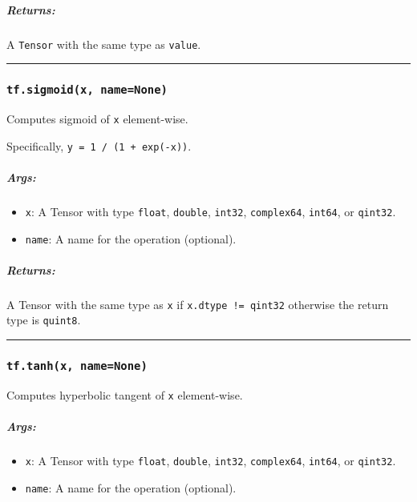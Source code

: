 \subparagraph{Returns: }\label{returns-4}

A \texttt{Tensor} with the same type as \texttt{value}.

\begin{center}\rule{0.5\linewidth}{\linethickness}\end{center}

\subsubsection{\texorpdfstring{\texttt{tf.sigmoid(x,\ name=None)}
}{tf.sigmoid(x, name=None) }}\label{tf.sigmoidx-namenone}

Computes sigmoid of \texttt{x} element-wise.

Specifically, \texttt{y\ =\ 1\ /\ (1\ +\ exp(-x))}.

\subparagraph{Args: }\label{args-5}

\begin{itemize}
\tightlist
\item
  \texttt{x}: A Tensor with type \texttt{float}, \texttt{double},
  \texttt{int32}, \texttt{complex64}, \texttt{int64}, or
  \texttt{qint32}.
\item
  \texttt{name}: A name for the operation (optional).
\end{itemize}

\subparagraph{Returns: }\label{returns-5}

A Tensor with the same type as \texttt{x} if
\texttt{x.dtype\ !=\ qint32} otherwise the return type is
\texttt{quint8}.

\begin{center}\rule{0.5\linewidth}{\linethickness}\end{center}

\subsubsection{\texorpdfstring{\texttt{tf.tanh(x,\ name=None)}
}{tf.tanh(x, name=None) }}\label{tf.tanhx-namenone}

Computes hyperbolic tangent of \texttt{x} element-wise.

\subparagraph{Args: }\label{args-6}

\begin{itemize}
\tightlist
\item
  \texttt{x}: A Tensor with type \texttt{float}, \texttt{double},
  \texttt{int32}, \texttt{complex64}, \texttt{int64}, or
  \texttt{qint32}.
\item
  \texttt{name}: A name for the operation (optional).
\end{itemize}

